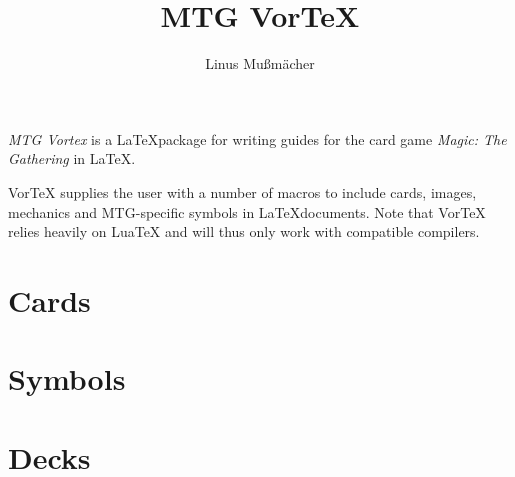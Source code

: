 \documentclass[a4paper]{scrartcl}
\title{MTG VorTeX}
\author{Linus Mußmächer}
\begin{document}
	\maketitle

	\emph{MTG Vortex} is a \LaTeX package for writing guides for the card game \emph{Magic: The Gathering} in \LaTeX.

	VorTeX supplies the user with a number of macros to include cards, images, mechanics and MTG-specific symbols in \LaTeX documents.
	Note that VorTeX relies heavily on LuaTeX and will thus only work with compatible compilers.

	\section{Cards}

	\section{Symbols}

	\section{Decks}
\end{document}
